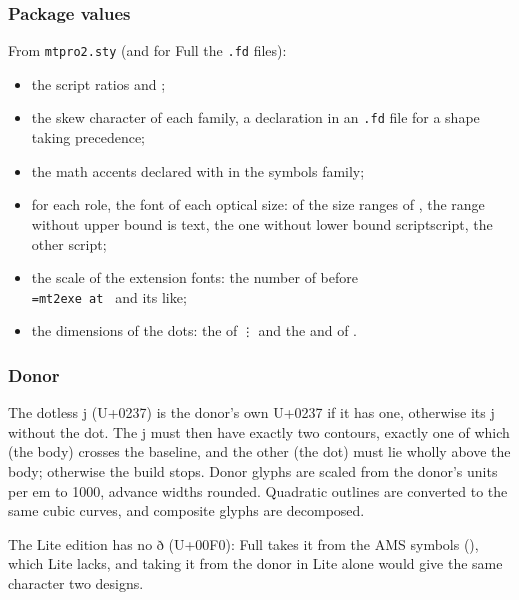 \documentclass[10pt]{article}
\newcommand\file[1]{\texttt{#1}}
\newcommand\code[1]{\texttt{#1}}
\newcommand\U[1]{U+#1}
\begin{document}
\subsubsection{Package values}\label{sec:package}

From \file{mtpro2.sty} (and for Full the \file{.fd} files):
\begin{itemize}
\item the script ratios \code{\string{}} and
  \code{\string{}};
\item the skew character of each family, a declaration in an
  \file{.fd} file for a shape taking precedence;
\item the math accents declared with \code{\string\DeclareMathAccent}
  in the symbols family;
\item for each role, the font of each optical size: of the size ranges
  of \code{\string\DeclareFontShape}, the range without upper bound is
  text, the one without lower bound scriptscript, the other script;
\item the scale of the extension fonts: the number of
  \code{\string\multiply\string\dimen@\string\tw@} before\\
  \code{\string\font\string\MTEXE@=mt2exe at \string\the\string\dimen@}
  and its like;
\item the dimensions of the dots: the \code{\string\baselineskip} of
  \code{\string\vdots} and the \code{\string\raise} and
  \code{\string\mkern} of \code{\string\ddots}.
\end{itemize}

\subsubsection{Donor}

The dotless j (\U{0237}) is the donor's own \U{0237} if it has one,
otherwise its j without the dot.  The j must then have exactly two
contours, exactly one of which (the body) crosses the baseline, and the
other (the dot) must lie wholly above the body; otherwise the build
stops.  Donor glyphs are scaled from the donor's units per em to 1000,
advance widths rounded. Quadratic outlines are converted to the same
cubic curves, and composite glyphs are decomposed.

The Lite edition has no ð (\U{00F0}): Full takes it from the AMS
symbols (\code{\string\eth}), which Lite lacks, and taking it from the
donor in Lite alone would give the same character two designs.
\end{document}
